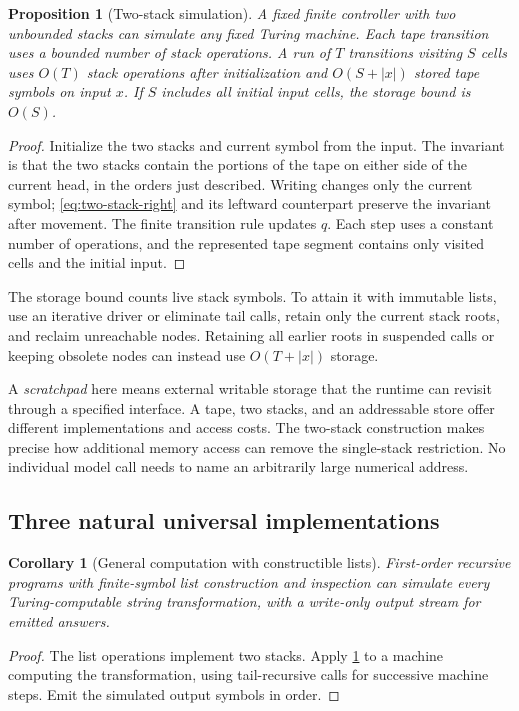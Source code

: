 \documentclass[11pt,twoside]{article}
\newtheorem{proposition}[theorem]{Proposition}
\newtheorem{corollary}[theorem]{Corollary}
\theoremstyle{definition}
\theoremstyle{remark}
\begin{document}
\begin{proposition}[Two-stack simulation]
\label{prop:two-stacks}
A fixed finite controller with two unbounded stacks can simulate any
fixed Turing machine. Each tape transition uses a bounded number of stack
operations. A run of $T$ transitions visiting $S$ cells uses $O(T)$
stack operations after initialization and $O(S+|x|)$ stored tape symbols
on input $x$. If $S$ includes all initial input cells, the storage bound
is $O(S)$.
\end{proposition}
\begin{proof}
Initialize the two stacks and current symbol from the input. The invariant
is that the two stacks contain the portions of the tape on either side of
the current head, in the orders just described. Writing changes only the
current symbol; \eqref{eq:two-stack-right} and its leftward counterpart
preserve the invariant after movement. The finite transition rule updates
$q$. Each step uses a constant number of operations, and the represented
tape segment contains only visited cells and the initial input.
\end{proof}

The storage bound counts live stack symbols. To attain it with immutable
lists, use an iterative driver or eliminate tail calls, retain only the
current stack roots, and reclaim unreachable nodes. Retaining all earlier
roots in suspended calls or keeping obsolete nodes can instead use
$O(T+|x|)$ storage.

A \emph{scratchpad} here means external writable storage that the runtime
can revisit through a specified interface. A tape, two stacks, and an
addressable store offer different implementations and access costs. The
two-stack construction makes precise how additional memory access can
remove the single-stack restriction. No individual model call needs to
name an arbitrarily large numerical address.

\subsection{Three natural universal implementations}

\begin{corollary}[General computation with constructible lists]
\label{cor:constructible-universal}
First-order recursive programs with finite-symbol list construction and
inspection can simulate every Turing-computable string transformation,
with a write-only output stream for emitted answers.
\end{corollary}
\begin{proof}
The list operations implement two stacks. Apply \cref{prop:two-stacks} to
a machine computing the transformation, using tail-recursive calls for
successive machine steps. Emit the simulated output symbols in order.
\end{proof}
\end{document}
